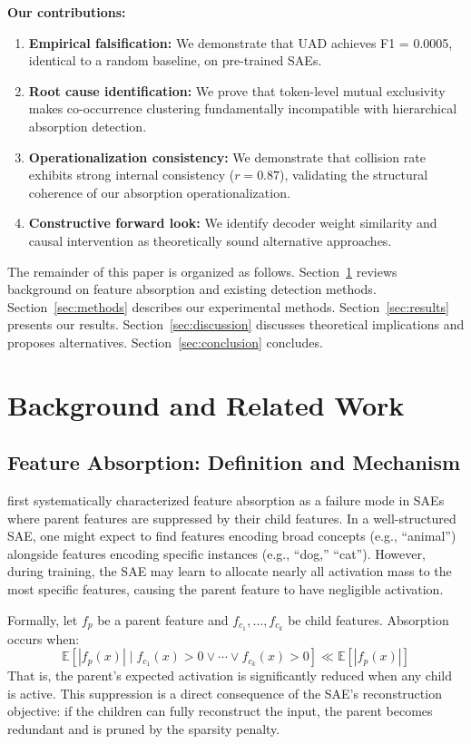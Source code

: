 \documentclass{article}
\begin{document}
\textbf{Our contributions:}
\begin{enumerate}
\item \textbf{Empirical falsification:} We demonstrate that UAD achieves F1 = 0.0005, identical to a random baseline, on pre-trained SAEs.
\item \textbf{Root cause identification:} We prove that token-level mutual exclusivity makes co-occurrence clustering fundamentally incompatible with hierarchical absorption detection.
\item \textbf{Operationalization consistency:} We demonstrate that collision rate exhibits strong internal consistency ($r = 0.87$), validating the structural coherence of our absorption operationalization.
\item \textbf{Constructive forward look:} We identify decoder weight similarity and causal intervention as theoretically sound alternative approaches.
\end{enumerate}

The remainder of this paper is organized as follows. Section~\ref{sec:background} reviews background on feature absorption and existing detection methods. Section~\ref{sec:methods} describes our experimental methods. Section~\ref{sec:results} presents our results. Section~\ref{sec:discussion} discusses theoretical implications and proposes alternatives. Section~\ref{sec:conclusion} concludes.

\section{Background and Related Work}
\label{sec:background}

\subsection{Feature Absorption: Definition and Mechanism}

\citet{chanin2024absorption} first systematically characterized feature absorption as a failure mode in SAEs where parent features are suppressed by their child features. In a well-structured SAE, one might expect to find features encoding broad concepts (e.g., ``animal'') alongside features encoding specific instances (e.g., ``dog,'' ``cat''). However, during training, the SAE may learn to allocate nearly all activation mass to the most specific features, causing the parent feature to have negligible activation.

Formally, let $f_p$ be a parent feature and $f_{c_1}, \ldots, f_{c_k}$ be child features. Absorption occurs when:
\begin{equation}
\mathbb{E}[|f_p(x)| \mid f_{c_1}(x) > 0 \lor \cdots \lor f_{c_k}(x) > 0] \ll \mathbb{E}[|f_p(x)|]
\end{equation}
That is, the parent's expected activation is significantly reduced when any child is active. This suppression is a direct consequence of the SAE's reconstruction objective: if the children can fully reconstruct the input, the parent becomes redundant and is pruned by the sparsity penalty.
\end{document}
